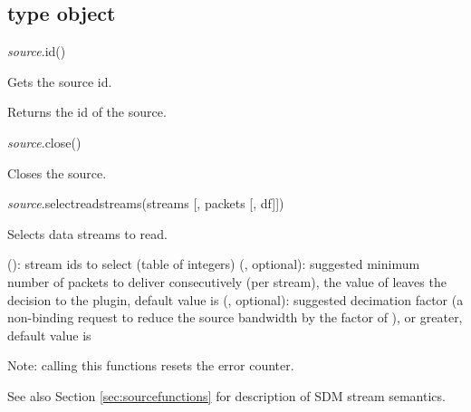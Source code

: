 \documentclass[a4paper,12pt,twoside,extrafontsizes]{memoir}
\begin{document}
\subsection{ type object}


\begin{luafuncprototype}
\emph{source}.id()
\end{luafuncprototype}

\begin{funcdescr}
	Gets the source id.
\end{funcdescr}

\begin{funcret}
	Returns the id of the source.
\end{funcret}


\begin{luafuncprototype}
\emph{source}.close()
\end{luafuncprototype}

\begin{funcdescr}
	Closes the source.
\end{funcdescr}


\begin{luafuncprototype}
\emph{source}.selectreadstreams(streams [, packets [, df]])
\end{luafuncprototype}

\begin{funcdescr}
	Selects data streams to read.
\end{funcdescr}

\begin{funcparams}
	 (): stream ids to select (table of integers)
	 (, optional): suggested minimum number of packets to deliver consecutively (per stream), the value of  leaves the decision to the plugin, default value is 
	 (, optional): suggested decimation factor (a non-binding request to reduce the source bandwidth by the factor of ),  or greater, default value is 
\end{funcparams}

\begin{funcremarks}
	Note: calling this functions resets the error counter.
	
	See also Section \ref{sec:sourcefunctions} for description of SDM stream semantics.
\end{funcremarks}
\end{document}
